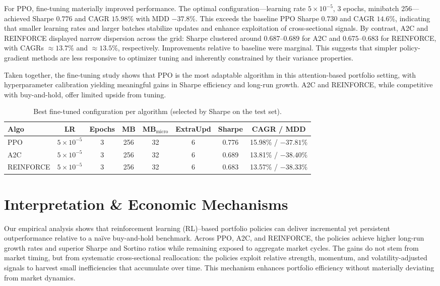 \documentclass[10pt,leqno]{amsart}
\begin{document}
For PPO, fine-tuning materially improved performance. The optimal configuration—learning rate $5\times10^{-5}$, 3 epochs, minibatch 256—achieved Sharpe $0.776$ and CAGR $15.98\%$ with MDD $-37.8\%$. This exceeds the baseline PPO Sharpe $0.730$ and CAGR $14.6\%$, indicating that smaller learning rates and larger batches stabilize updates and enhance exploitation of cross-sectional signals. By contrast, A2C and REINFORCE displayed narrow dispersion across the grid: Sharpe clustered around $0.687$–$0.689$ for A2C and $0.675$–$0.683$ for REINFORCE, with CAGRs $\approx13.7\%$ and $\approx13.5\%$, respectively. Improvements relative to baseline were marginal. This suggests that simpler policy-gradient methods are less responsive to optimizer tuning and inherently constrained by their variance properties.

Taken together, the fine-tuning study shows that PPO is the most adaptable algorithm in this attention-based portfolio setting, with hyperparameter calibration yielding meaningful gains in Sharpe efficiency and long-run growth. A2C and REINFORCE, while competitive with buy-and-hold, offer limited upside from tuning.

\begin{table}[htbp]
\centering
\caption{Best fine-tuned configuration per algorithm (selected by Sharpe on the test set).}
\label{tab:ft_best}
\begin{tabular}{lccccccc}
\toprule
Algo & LR & Epochs & MB & MB$_{\text{micro}}$ & ExtraUpd & Sharpe & CAGR / MDD \\
\midrule
PPO        & $5\times10^{-5}$ & 3 & 256 & 32 & 6 & 0.776 & 15.98\% / $-37.81\%$ \\
A2C        & $5\times10^{-5}$ & 3 & 256 & 32 & 6 & 0.689 & 13.81\% / $-38.40\%$ \\
REINFORCE  & $5\times10^{-5}$ & 3 & 256 & 32 & 6 & 0.683 & 13.57\% / $-38.33\%$ \\
\bottomrule
\end{tabular}
\end{table}





\bigskip





\section{Interpretation \& Economic Mechanisms}\label{sec8}
Our empirical analysis shows that reinforcement learning (RL)–based portfolio policies can deliver incremental yet persistent outperformance relative to a naïve buy-and-hold benchmark. Across PPO, A2C, and REINFORCE, the policies achieve higher long-run growth rates and superior Sharpe and Sortino ratios while remaining exposed to aggregate market cycles. The gains do not stem from market timing, but from systematic cross-sectional reallocation: the policies exploit relative strength, momentum, and volatility-adjusted signals to harvest small inefficiencies that accumulate over time. This mechanism enhances portfolio efficiency without materially deviating from market dynamics.
\end{document}

